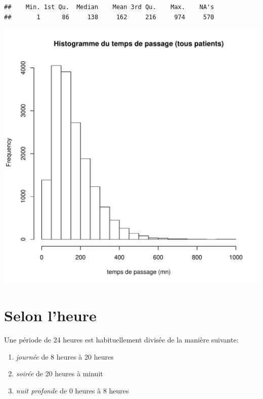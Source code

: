\documentclass[12pt,english,french,twoside]{report}\usepackage[]{graphicx}\usepackage[]{color}
\makeatletter
\def\maxwidth{ %
  \ifdim\Gin@nat@width>\linewidth
    \linewidth
  \else
    \Gin@nat@width
  \fi
}
\newenvironment{kframe}{%
 \def\at@end@of@kframe{}%
 \ifinner\ifhmode%
  \def\at@end@of@kframe{\end{minipage}}%
  \begin{minipage}{\columnwidth}%
 \fi\fi%
 \def\FrameCommand##1{\hskip\@totalleftmargin \hskip-\fboxsep
 \colorbox{shadecolor}{##1}\hskip-\fboxsep
     \hskip-\linewidth \hskip-\@totalleftmargin \hskip\columnwidth}%
 \MakeFramed {\advance\hsize-\width
   \@totalleftmargin\z@ \linewidth\hsize
   \@setminipage}}%
 {\par\unskip\endMakeFramed%
 \at@end@of@kframe}
\newenvironment{knitrout}{}{} %
\makeatother
\begin{document}
\begin{knitrout}
\color{fgcolor}\begin{kframe}


{\ttfamily\noindent\color{warningcolor}{\#\# Warning: All formats failed to parse. No formats found.}}\begin{verbatim}
##    Min. 1st Qu.  Median    Mean 3rd Qu.    Max.    NA's 
##       1      86     138     162     216     974     570
\end{verbatim}
\end{kframe}
\includegraphics[width=\maxwidth]{figure/passage} 

\end{knitrout}




\section*{Selon l'heure}

Une période de 24 heures est habituellement divisée de la manière suivante:
\begin{enumerate}
  \item \emph{journée} de 8 heures à 20 heures
  \item \emph{soirée} de 20 heures à minuit
  \item  \emph{nuit profonde} de 0 heures à 8 heures
\end{enumerate}
\end{document}

